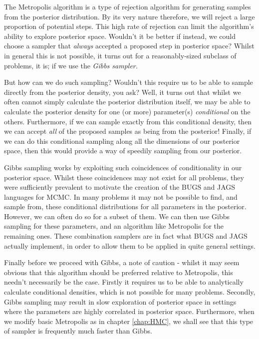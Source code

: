 \documentclass[11pt,fullpage]{book}
\begin{document}
The Metropolis algorithm is a type of rejection algorithm for generating samples from the posterior distribution. By its very nature therefore, we will reject a large proportion of potential steps. This high rate of rejection can limit the algorithm's ability to explore posterior space. Wouldn't it be better if instead, we could choose a sampler that \textit{always} accepted a proposed step in posterior space? Whilst in general this is not possible, it turns out for a reasonably-sized subclass of problems, it is; if we use the \textit{Gibbs sampler.}  

But how can we do such sampling? Wouldn't this require us to be able to sample directly from the posterior density, you ask? Well, it turns out that whilst we often cannot simply calculate the posterior distribution itself, we may be able to calculate the posterior density for one (or more) parameter(s) \textit{conditional} on the others. Furthermore, if we can sample exactly from this conditional density, then we can accept \textit{all} of the proposed samples as being from the posterior! Finally, if we can do this conditional sampling along all the dimensions of our posterior space, then this would provide a way of speedily sampling from our posterior. 

Gibbs sampling works by exploiting such coincidences of conditionality in our posterior space. Whilst these coincidences may not exist for all problems, they were sufficiently prevalent to motivate the creation of the BUGS and JAGS languages for MCMC. In many problems it may not be possible to find, and sample from, these conditional distributions for all parameters in the posterior. However, we can often do so for a subset of them. We can then use Gibbs sampling for these parameters, and an algorithm like Metropolis for the remaining ones. These combination samplers are in fact what BUGS and JAGS actually implement, in order to allow them to be applied in quite general settings. 

Finally before we proceed with Gibbs, a note of caution - whilst it may seem obvious that this algorithm should be preferred relative to Metropolis, this needn't necessarily be the case. Firstly it requires us to be able to analytically calculate conditional densities, which is not possible for many problems. Secondly, Gibbs sampling may result in slow exploration of posterior space in settings where the parameters are highly correlated in posterior space. Furthermore, when we modify basic Metropolis as in chapter \ref{chap:HMC}, we shall see that this type of sampler is frequently much faster than Gibbs. 
\end{document}
